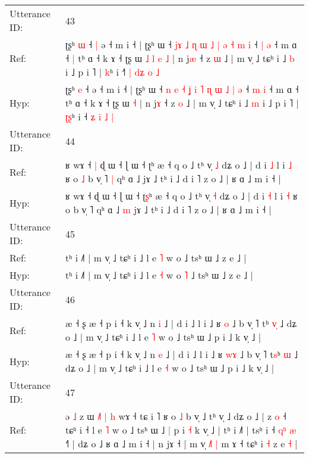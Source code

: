 \documentclass[10pt]{article}
\DeclareRobustCommand{\hl}[1]{{\textcolor{red}{#1}}}
\begin{document}
\begin{longtable}{ll}
 \\
\midrule
Utterance ID: & 43 \\
Ref: & ʈʂʰ \hl{ɯ} ˧\hl{ }\hl{|} ə ˧ m i ˧ | ʈʂʰ ɯ ˧ \hl{}\hl{j}\hl{ɤ} \hl{˩} \hl{ɳ} \hl{ɯ} \hl{˩} \hl{|} \hl{ə} \hl{˧} \hl{m} \hl{i} ˧ \hl{|} \hl{ə} ˧ m ɑ ˧\hl{ }\hl{|} tʰ ɑ ˧ k ɤ ˧ ʈʂ ɯ\hl{ }\hl{˩}\hl{ }\hl{l}\hl{ }\hl{e} \hl{˩} | n j\hl{æ} ˧ z \hl{ɯ} ˩ | m v̩ ˩ tɕʰ i ˩ \hl{b} i ˩ p i ˥ | \hl{}\hl{k}ʰ i ˧\hl{˥} \hl{|} \hl{d}\hl{ʑ} \hl{o} \hl{˩}
 \\
Hyp: & ʈʂʰ \hl{e} ˧\hl{}\hl{} ə ˧ m i ˧ | ʈʂʰ ɯ ˧ \hl{n}\hl{ }\hl{e} \hl{˧} \hl{ʝ} \hl{i} \hl{˥} \hl{ɳ} \hl{ɯ} \hl{˩} \hl{|} \hl{ə} ˧ \hl{m} \hl{i} ˧ m ɑ ˧\hl{}\hl{} tʰ ɑ ˧ k ɤ ˧ ʈʂ ɯ\hl{}\hl{}\hl{}\hl{}\hl{}\hl{} \hl{˧} | n j\hl{ɤ} ˧ z \hl{o} ˩ | m v̩ ˩ tɕʰ i ˩ \hl{m} i ˩ p i ˥ | \hl{ʈ}\hl{ʂ}ʰ i ˧\hl{} \hl{ʑ} \hl{}\hl{i} \hl{˩} \hl{|}
 \\
\midrule
Utterance ID: & 44 \\
Ref: & ʁ wɤ ˧\hl{ }\hl{|} ɖ ɯ ˧ ɭ ɯ ˧ ʈ\hl{}ʰ æ ˧ q o ˩ tʰ v̩ \hl{˩} dʑ o ˩ | d i \hl{˩} l i \hl{˩} ʁ o\hl{ }\hl{˩} b v̩ ˥\hl{ }\hl{|} qʰ ɑ ˩\hl{}\hl{} jɤ ˩ tʰ i ˩ d i ˥ z o ˩ | ʁ ɑ ˩ m i ˧ |
 \\
Hyp: & ʁ wɤ ˧\hl{}\hl{} ɖ ɯ ˧ ɭ ɯ ˧ ʈ\hl{ʂ}ʰ æ ˧ q o ˩ tʰ v̩ \hl{˧} dʑ o ˩ | d i \hl{˧} l i \hl{˧} ʁ o\hl{}\hl{} b v̩ ˥\hl{}\hl{} qʰ ɑ ˩\hl{ }\hl{m} jɤ ˩ tʰ i ˩ d i ˥ z o ˩ | ʁ ɑ ˩ m i ˧ |
 \\
\midrule
Utterance ID: & 45 \\
Ref: & tʰ i ˩˥ | m v̩ ˩ tɕʰ i ˩ l e \hl{˥} w o\hl{}\hl{} ˩ tsʰ ɯ ˩ z e ˩ |
 \\
Hyp: & tʰ i ˩˥ | m v̩ ˩ tɕʰ i ˩ l e \hl{˧} w o\hl{ }\hl{˥} ˩ tsʰ ɯ ˩ z e ˩ |
 \\
\midrule
Utterance ID: & 46 \\
Ref: & æ ˧ ʂ æ ˧ p i ˧ k v̩ ˩ n \hl{i} ˩ | d i ˩ l i ˩ ʁ \hl{}\hl{o} ˩ b v̩ ˥ t\hl{}ʰ \hl{v}\hl{̩} ˩ dʑ o ˩ | m v̩ ˩ tɕʰ i ˩ l e \hl{˥} w o ˩ tsʰ ɯ ˩ p i ˩ k v̩ ˩ |
 \\
Hyp: & æ ˧ ʂ æ ˧ p i ˧ k v̩ ˩ n \hl{e} ˩ | d i ˩ l i ˩ ʁ \hl{w}\hl{ɤ} ˩ b v̩ ˥ t\hl{s}ʰ \hl{}\hl{ɯ} ˩ dʑ o ˩ | m v̩ ˩ tɕʰ i ˩ l e \hl{˧} w o ˩ tsʰ ɯ ˩ p i ˩ k v̩ ˩ |
 \\
\midrule
Utterance ID: & 47 \\
Ref: & ə\hl{ }\hl{˩} z ɯ \hl{˩}\hl{˥} \hl{|}\hl{ }\hl{h} wɤ ˧ tɕ i ˥ ʁ o \hl{˩} b v̩ ˩ tʰ v̩ ˩ dʑ o ˩ | z \hl{o} ˧ tɕʰ i ˧\hl{}\hl{}\hl{} l e \hl{˥} w o ˩ tsʰ ɯ ˩\hl{ }\hl{|} p i \hl{˧} k v̩ ˩ | tʰ i ˩˥ | tsʰ i ˧ \hl{q}\hl{ʰ}\hl{ }\hl{æ} ˧˥ | dʑ o ˩\hl{}\hl{} ʁ ɑ ˩ m i ˧ | n jɤ ˧ | m v̩\hl{ }\hl{˩}\hl{˥} \hl{|} m ɤ ˧ tɕʰ i\hl{ }\hl{˧} z e \hl{˧} |

\end{longtable}
\end{document}
